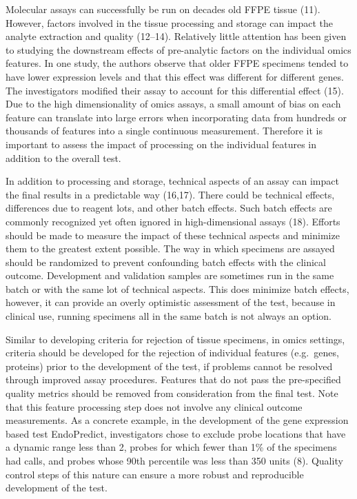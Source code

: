\documentclass[11pt]{article}
\begin{document}
Molecular assays can successfully be run on decades old FFPE tissue
(11). However, factors involved in the tissue processing and storage can
impact the analyte extraction and quality (12--14). Relatively little
attention has been given to studying the downstream effects of
pre-analytic factors on the individual omics features. In one study, the
authors observe that older FFPE specimens tended to have lower
expression levels and that this effect was different for different
genes. The investigators modified their assay to account for this
differential effect (15). Due to the high dimensionality of omics
assays, a small amount of bias on each feature can translate into large
errors when incorporating data from hundreds or thousands of features
into a single continuous measurement. Therefore it is important to
assess the impact of processing on the individual features in addition
to the overall test.

In addition to processing and storage, technical aspects of an assay can
impact the final results in a predictable way (16,17). There could be
technical effects, differences due to reagent lots, and other batch
effects. Such batch effects are commonly recognized yet often ignored in
high-dimensional assays (18). Efforts should be made to measure the
impact of these technical aspects and minimize them to the greatest
extent possible. The way in which specimens are assayed should be
randomized to prevent confounding batch effects with the clinical
outcome. Development and validation samples are sometimes run in the
same batch or with the same lot of technical aspects. This does minimize
batch effects, however, it can provide an overly optimistic assessment
of the test, because in clinical use, running specimens all in the same
batch is not always an option.

Similar to developing criteria for rejection of tissue specimens, in
omics settings, criteria should be developed for the rejection of
individual features (e.g.~genes, proteins) prior to the development of
the test, if problems cannot be resolved through improved assay
procedures. Features that do not pass the pre-specified quality metrics
should be removed from consideration from the final test. Note that this
feature processing step does not involve any clinical outcome
measurements. As a concrete example, in the development of the gene
expression based test EndoPredict, investigators chose to exclude probe
locations that have a dynamic range less than 2, probes for which fewer
than 1\% of the specimens had calls, and probes whose 90th percentile
was less than 350 units (8). Quality control steps of this nature can
ensure a more robust and reproducible development of the test.
\end{document}
